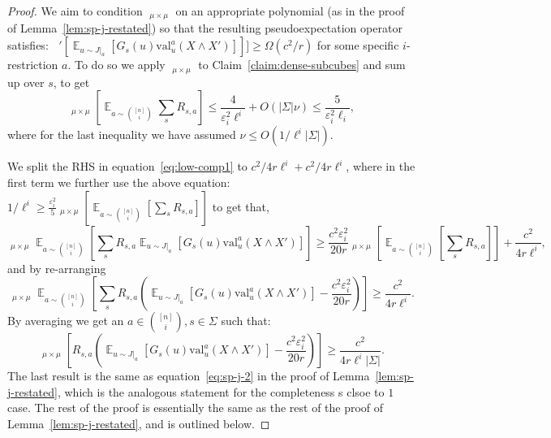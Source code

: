 \documentclass[11pt]{article}
\DeclareMathOperator*{\E}{\mathbb{E}}
\DeclareMathOperator*{\pE}{\widetilde{\mathbb{E}}}
\def \tO {\widetilde{O}}
\def \eps {{\varepsilon}}
\def \val {\mathrm{val}}
\newtheorem{claim}[theorem]{Claim}
\theoremstyle{definition}
\begin{document}
\begin{proof}
We aim to condition $\pE_{\mu \times \mu}$ on an appropriate polynomial (as in the proof of Lemma~\ref{lem:sp-j-restated}) so that the resulting pseudoexpectation operator satisfies: $\pE'[\E_{u \sim J|_a}[G_s(u)\val^a_u(X \wedge X')]]] \geq \Omega(c^2/r)$ for some specific $i$-restriction $a$. To do so we apply $\pE_{\mu \times \mu}$ to Claim~\ref{claim:dense-subcubes} and sum up over $s$, to get
\[\pE_{\mu \times \mu}\left[\E_{a \sim {[n] \choose i}}\sum_s R_{s,a}\right] \leq \frac{4}{\eps_i^2 \ell^i} + O(|\Sigma|\nu) \leq \frac{5}{\eps_i^2\ell_i},\]
where for the last inequality we have assumed $\nu \leq O(1/\ell^i|\Sigma|)$.

We split the RHS in equation~\ref{eq:low-comp1} to $c^2/4r\ell^i + c^2/4r\ell^i$, where in the first term we further use the above equation: $1/\ell^i \geq \frac{\eps_i^2}{5}\pE_{\mu \times \mu}[\E_{a \sim {[n] \choose i}}[\sum_s R_{s,a}]]$ to get that,
\begin{equation*}
\pE_{\mu \times \mu}\E_{a \sim {[n] \choose i}}\left[\sum_s R_{s,a} \E_{u \sim J|_a}[G_s(u)\val^a_u(X \wedge X')]\right] \geq \frac{c^2\eps_i^2}{20r}\pE_{\mu \times \mu}\left[\E_{a \sim {[n] \choose i}}[\sum_s R_{s,a}]\right] + \frac{c^2}{4r\ell^i},
\end{equation*}
and by re-arranging 
\begin{equation*}
\pE_{\mu \times \mu}\E_{a \sim {[n] \choose i}}\left[\sum_s R_{s,a} \left(\E_{u \sim J|_a}[G_s(u)\val^a_u(X \wedge X')] - \frac{c^2\eps_i^2}{20r}\right)\right] \geq \frac{c^2}{4r\ell^i}.
\end{equation*}
By averaging we get an $a \in {[n] \choose i}, s \in \Sigma$ such that:
\begin{equation}\label{eq:low-comp2}
\pE_{\mu \times \mu}\left[R_{s,a} \left(\E_{u \sim J|_a}[G_s(u)\val^a_u(X \wedge X')] - \frac{c^2\eps_i^2}{20r}\right)\right] \geq \frac{c^2}{4r\ell^i|\Sigma|}.
\end{equation}
The last result is the same as equation~\eqref{eq:sp-j-2}
in the proof of Lemma~\ref{lem:sp-j-restated}, 
which is the analogous statement for the completeness s clsoe to $1$ case. The rest of the proof is essentially the same as the rest of the proof of Lemma~\ref{lem:sp-j-restated}, and is outlined below. 


\end{proof}
\end{document}
